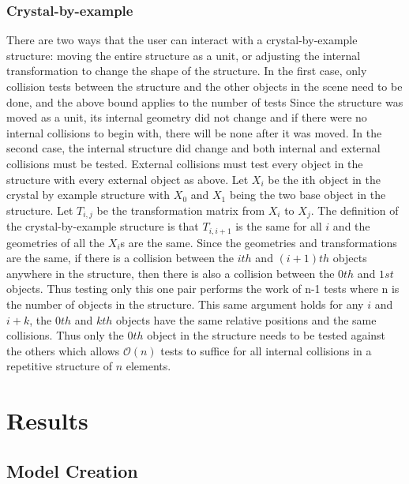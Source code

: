 \documentclass{article} %
\begin{document}
\subsubsection{Crystal-by-example}
There are two ways that the user can interact with a crystal-by-example structure: moving the entire structure as a unit, or adjusting the internal transformation to change the shape of the structure.  In the first case, only collision tests between the structure and the other objects in the scene need to be done, and the above bound applies to the number of tests  Since the structure was moved as a unit, its internal geometry did not change and if there were no internal collisions to begin with, there will be none after it was moved.  In the second case, the internal structure did change and both internal and external collisions must be tested.  External collisions must test every object in the structure with every external object as above.  Let $X_i$ be the ith object in the crystal by example structure with $X_0$ and $X_1$ being the two base object in the structure.  Let $T_{i,j}$ be the transformation matrix from $X_i$ to $X_j$.  The definition of the crystal-by-example structure is that $T_{i,i+1}$ is the same for all $i$ and the geometries of all the $X_i$s are the same.  Since the geometries and transformations are the same, if there is a collision between the $ith$ and $(i+1)th$ objects anywhere in the structure, then there is also a collision between the $0th$ and $1st$ objects.  Thus testing only this one pair performs the work of n-1 tests where n is the number of objects in the structure.  This same argument holds for any $i$ and $i+k$, the $0th$ and $kth$ objects have the same relative positions and the same collisions.  Thus only the $0th$ object in the structure needs to be tested against the others which allows $\mathcal{O}(n)$ tests to suffice for all internal collisions in a repetitive structure of $n$ elements.

\section{Results}
\subsection{Model Creation}
\end{document}

